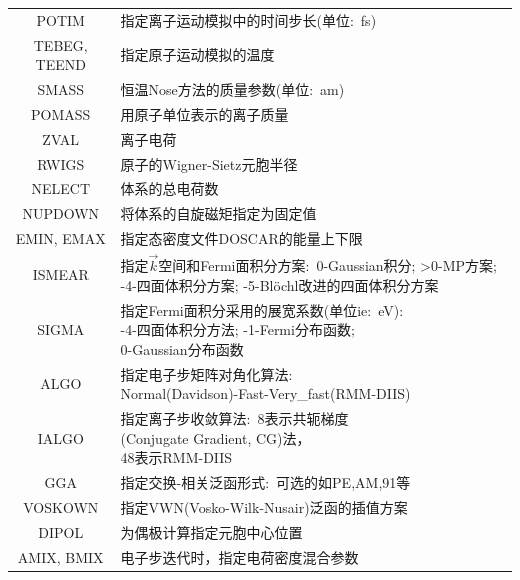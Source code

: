 \begin{longtable}[c]{|@{\extracolsep{\fill}}c|@{\extracolsep{\fill}}l|}
	\textrm{POTIM} &指定离子运动模拟中的时间步长(单位:~\textrm{fs})\\
	\textrm{TEBEG, TEEND} &指定原子运动模拟的温度\\
	\textrm{SMASS} &恒温\textrm{Nose}方法的质量参数(单位:~\textrm{am})\\
	\midrule
	\textrm{POMASS} &用原子单位表示的离子质量\\
	\textrm{ZVAL} &离子电荷\\
	\textrm{RWIGS} &原子的\textrm{Wigner-Sietz}元胞半径\\
	\textrm{NELECT} &体系的总电荷数\\
	\textrm{NUPDOWN} &将体系的自旋磁矩指定为固定值\\
	\textrm{EMIN, EMAX} &指定态密度文件\textrm{DOSCAR}的能量上下限\\
	\textrm{ISMEAR} &\makecell[tl]{指定$\vec k$空间和\textrm{Fermi}面积分方案:~0-\textrm{Gaussian}积分; \\>0-\textrm{MP}方案; -4-四面体积分方案; \\-5-\textrm{Bl\"ochl}改进的四面体积分方案}\\
	\textrm{SIGMA} &\makecell[tl]{指定\textrm{Fermi}面积分采用的展宽系数(单位ie:~\textrm{eV}):\\-4-四面体积分方法; -1-\textrm{Fermi}分布函数; \\0-\textrm{Gaussian}分布函数}\\
	\midrule
	\textrm{ALGO} &\makecell[tl]{指定电子步矩阵对角化算法:\\\textrm{Normal(Davidson)-Fast-Very\_fast(RMM-DIIS)}}\\
	\textrm{IALGO} &\makecell[tl]{指定离子步收敛算法:~8表示共轭梯度\\\textrm{(Conjugate Gradient, CG)}法，\\48表示\textrm{RMM-DIIS}}\\
	\textrm{GGA} &指定交换-相关泛函形式:~可选的如\textrm{PE},\textrm{AM},\textrm{91}等\\
	\textrm{VOSKOWN} &指定\textrm{VWN(Vosko-Wilk-Nusair)}泛函的插值方案\\
	\textrm{DIPOL} &为偶极计算指定元胞中心位置\\
	\textrm{AMIX, BMIX} &电子步迭代时，指定电荷密度混合参数\\

\end{longtable}
